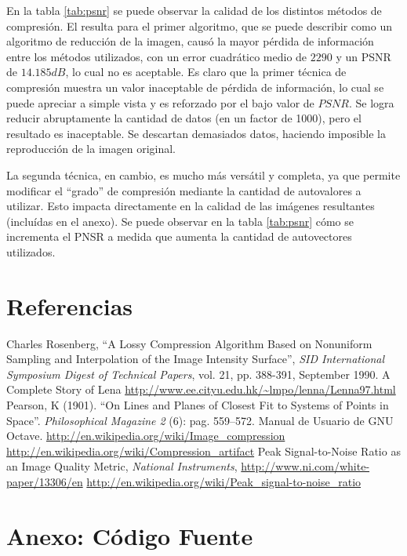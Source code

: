 \documentclass[twocolumn,a4paper,10pt]{article}
\begin{document}
En la tabla \ref{tab:psnr} se puede observar la calidad de los distintos m\'etodos de compresi\'on.
El resulta para el primer algoritmo, que se puede describir como un algoritmo de reducción de la imagen, causó la mayor pérdida de información entre los 
métodos utilizados, con un error cuadrático medio de $2290$ y un PSNR de $14.185 dB$, lo cual no es aceptable.
Es claro que la primer t\'ecnica de compresi\'on muestra un valor inaceptable de pérdida de información, lo cual se puede apreciar a simple vista y es 
reforzado por el bajo valor de $PSNR$. Se logra reducir abruptamente la cantidad de datos (en un factor de 1000), pero el resultado es inaceptable. 
Se descartan demasiados datos, haciendo imposible la reproducci\'on de la imagen original.

La segunda t\'ecnica, en cambio, es mucho m\'as vers\'atil y completa, ya que permite modificar el ``grado'' de compresi\'on mediante la cantidad de autovalores 
a utilizar.  Esto impacta directamente en la calidad de las imágenes resultantes (incluídas en el anexo). Se puede observar en la tabla \ref{tab:psnr} cómo 
se incrementa el PNSR a medida que aumenta la cantidad de autovectores utilizados.

\section*{Referencias}
\begin{thebibliography}{99}
    
    Charles Rosenberg, ``A Lossy Compression Algorithm Based on Nonuniform Sampling and Interpolation of the Image Intensity Surface'', \textit{SID International Symposium Digest of Technical Papers}, vol. 21, pp. 388-391, September 1990.
    A Complete Story of Lena \url{http://www.ee.cityu.edu.hk/~lmpo/lenna/Lenna97.html}
     Pearson, K (1901). ``On Lines and Planes of Closest Fit to Systems of Points in Space''. \textit{Philosophical Magazine 2} (6): pag. 559–572.
     Manual de Usuario de GNU Octave.
     \url{http://en.wikipedia.org/wiki/Image\_compression}
     \url{http://en.wikipedia.org/wiki/Compression\_artifact}
     Peak Signal-to-Noise Ratio as an Image Quality Metric, \textit{National Instruments}, \url{http://www.ni.com/white-paper/13306/en}
     \url{http://en.wikipedia.org/wiki/Peak_signal-to-noise_ratio}

\end{thebibliography}

\newpage
\section*{Anexo: Código Fuente}
    
    
    
\end{document}
